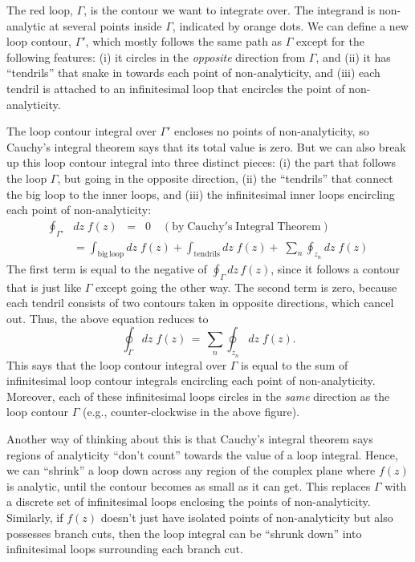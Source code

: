 \documentclass[10pt,a4paper]{article}
\begin{document}
The red loop, $\Gamma$, is the contour we want to integrate over. The
integrand is non-analytic at several points inside $\Gamma$, indicated
by orange dots. We can define a new loop contour, $\Gamma'$, which
mostly follows the same path as $\Gamma$ except for the following
features: (i) it circles in the \emph{opposite} direction from
$\Gamma$, and (ii) it has ``tendrils'' that snake in towards each
point of non-analyticity, and (iii) each tendril is attached to an
infinitesimal loop that encircles the point of non-analyticity.

The loop contour integral over $\Gamma'$ encloses no points of
non-analyticity, so Cauchy's integral theorem says that its total
value is zero. But we can also break up this loop contour integral
into three distinct pieces: (i) the part that follows the loop
$\Gamma$, but going in the opposite direction, (ii) the ``tendrils''
that connect the big loop to the inner loops, and (iii) the
infinitesimal inner loops encircling each point of non-analyticity:
\begin{align}
  \oint_{\Gamma'}& dz\; f(z)
\;\;= \;\; 0 \quad (\mathrm{by}\;\mathrm{Cauchy's}\;\mathrm{Integral}\;\mathrm{Theorem}) \\
&= \int_{\mathrm{big}\,\mathrm{loop}} dz\; f(z) + \int_{\mathrm{tendrils}} dz\; f(z) +\; \sum_n \oint_{z_n} dz\; f(z)
\end{align}
The first term is equal to the negative of $\oint_\Gamma dz \, f(z)$,
since it follows a contour that is just like $\Gamma$ except going the
other way. The second term is zero, because each tendril consists of
two contours taken in opposite directions, which cancel out. Thus, the
above equation reduces to
\begin{equation}
\oint_\Gamma dz\; f(z) \,=\, \sum_n \oint_{z_n} dz\; f(z).
\end{equation}
This says that the loop contour integral over $\Gamma$ is equal to the
sum of infinitesimal loop contour integrals encircling each point of
non-analyticity. Moreover, each of these infinitesimal loops circles in
the \emph{same} direction as the loop contour $\Gamma$ (e.g.,
counter-clockwise in the above figure).

Another way of thinking about this is that Cauchy's integral theorem
says regions of analyticity ``don't count'' towards the value of a
loop integral. Hence, we can ``shrink'' a loop down across any region
of the complex plane where $f(z)$ is analytic, until the contour
becomes as small as it can get. This replaces $\Gamma$ with a discrete
set of infinitesimal loops enclosing the points of
non-analyticity. Similarly, if $f(z)$ doesn't just have isolated
points of non-analyticity but also possesses branch cuts, then the
loop integral can be ``shrunk down'' into infinitesimal loops
surrounding each branch cut.
\end{document}
